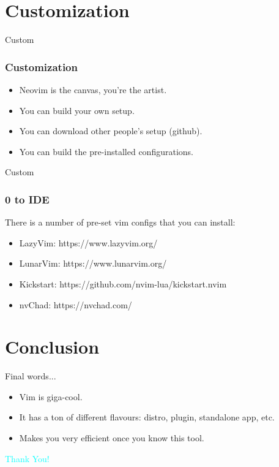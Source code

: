 \documentclass{beamer}
\begin{document}
\section{Customization}
\begin{frame}{Custom}
    \frametitle{Customization}
    \begin{itemize}
        \item Neovim is the canvas, you're the artist.
        \item You can build your own setup.
        \item You can download other people's setup (github).
        \item You can build the pre-installed configurations.
    \end{itemize}
\end{frame}

\begin{frame}{Custom}
    \frametitle{0 to IDE}
    There is a number of pre-set vim configs that you can install:
    \begin{itemize}
        \item LazyVim: https://www.lazyvim.org/ 
        \item LunarVim: https://www.lunarvim.org/
        \item Kickstart: https://github.com/nvim-lua/kickstart.nvim
        \item nvChad: https://nvchad.com/
    \end{itemize}
\end{frame}

\section{Conclusion}
\begin{frame}{Final words...}
    \begin{itemize}
        \item Vim is giga-cool.
        \item It has a ton of different flavours: distro, plugin, standalone app, etc.
        \item Makes you very efficient once you know this tool.
    \end{itemize}
\end{frame}

\begin{frame}
    \centering
    {\Huge \textcolor{cyan}{Thank You!}}
\end{frame}
\end{document}
